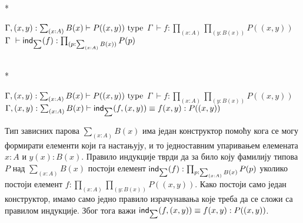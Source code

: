 \documentclass[12pt,oneside]{memoir}
\begin{document}
\begin{samepage}
    \begin{center}
        \begin{minipage}{.40\textwidth}
            \begin{prooftree}
            \end{prooftree}
        \end{minipage}
        \begin{minipage}{.45\textwidth}
            \begin{prooftree}
            \end{prooftree}
        \end{minipage}
        \\*
        \bigskip%
        \begin{minipage}{\textwidth}
            \begin{prooftree}
                \def\fCenter{\Gamma}
                \Axiom$\fCenter, (x, y) : \sum_{(x : A)} B(x) \vdash P((x, y))~\type$
                \noLine%
                \UnaryInf$\fCenter\ \vdash f : \prod_{(x : A)} \prod_{(y : B(x))} P((x, y))$
                \UnaryInf$\fCenter\ \vdash \ind{\sum} (f) : \prod_{(p : \sum_{(x:A)} B(x))} P(p)$
            \end{prooftree}
        \end{minipage}
        \\*
        \bigskip%
        \begin{minipage}{\textwidth}
            \begin{prooftree}
                \def\fCenter{\Gamma}
                \Axiom$\fCenter, (x, y) : \sum_{(x : A)} B(x) \vdash P((x, y))~\type$
                \noLine%
                \UnaryInf$\fCenter\ \vdash f : \prod_{(x : A)} \prod_{(y : B(x))} P((x, y))$
                \UnaryInf$\fCenter, (x, y) : \sum_{(x : A)} B(x) \vdash \ind{\sum} (f, (x, y)) \equiv f(x, y) : P((x, y))$
            \end{prooftree}
        \end{minipage}
    \end{center}
\end{samepage}

Тип зависних парова $\sum_{(x:A)} B (x)$ има један конструктор помоћу кога се могу формирати елементи који га настањују, и то једноставним упаривањем елемената $x : A$ и $y(x) : B(x)$. Правило индукције тврди да за било коју фамилију типова $P$ над $\sum_{(x : A)} B (x)$ постоји елемент $\mathsf{ind}_{\sum}(f) : \prod_{p : \sum_{(x : A)} B(x)} P (p)$ уколико постоји елемент $f : \prod_{(x : A)} \prod_{(y : B(x))} P ((x, y))$. Како постоји само један конструктор, имамо само једно правило израчунавања које треба да се сложи са правилом индукције. Због тога важи $\mathsf{ind}_{\sum}(f, (x, y)) \equiv f(x, y) : P((x, y))$.
\end{document}
